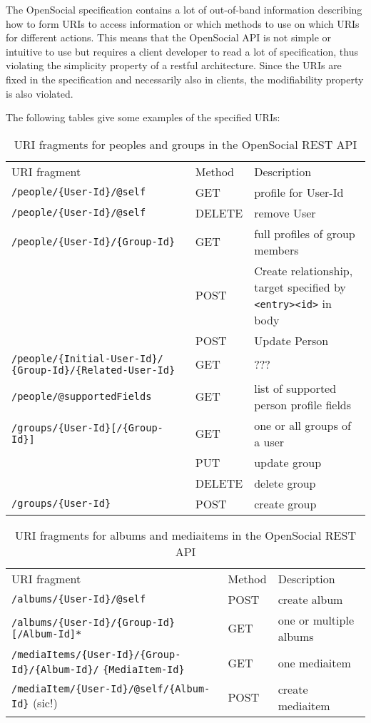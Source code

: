 \documentclass[12pt,a4paper]{scrartcl}		%
\begin{document}
The OpenSocial specification contains a lot of out-of-band information
describing how to form URIs to access information or which methods to use on
which URIs for different actions. This means that the OpenSocial API is not
simple or intuitive to use but requires a client developer to read a lot of
specification, thus violating the simplicity property of a restful
architecture. Since the URIs are fixed in the specification and necessarily also
in clients, the modifiability property is also violated.\cite[sec
2.3]{Fielding2000}

The following tables give some examples of the specified URIs:

\begin{table}[h]
\begin{tabular}{p{6.5cm} l p{10cm}}
  URI fragment & Method & Description \\
  \verb:/people/{User-Id}/@self: & GET & profile for User-Id \\
  \verb:/people/{User-Id}/@self: & DELETE & remove User \\
  \verb:/people/{User-Id}/{Group-Id}: & GET & full profiles of group members \\
  \verb:: & POST & Create relationship, target specified \newline by \verb:<entry><id>: in body \\
   & POST & Update Person \\
  \verb:/people/{Initial-User-Id}/: \newline \verb:{Group-Id}/{Related-User-Id}: & GET & ??? \\
  \verb:/people/@supportedFields: & GET & list of supported person profile fields \\
  \verb:/groups/{User-Id}[/{Group-Id}]: & GET & one or all groups of a user \\
   & PUT & update group \\
   & DELETE & delete group \\
  \verb:/groups/{User-Id}: & POST & create group \\
\end{tabular}
  \caption{URI fragments for peoples and groups in the OpenSocial REST API}
\end{table}

\begin{table}[h]
\begin{tabular}{p{9.5cm} l p{8cm}}
  URI fragment & Method & Description \\
  \verb:/albums/{User-Id}/@self: & POST & create album \\
  \verb:/albums/{User-Id}/{Group-Id}[/Album-Id]*: & GET & one or multiple albums \\
  \verb:/mediaItems/{User-Id}/{Group-Id}/{Album-Id}/: \newline \verb:{MediaItem-Id}: & GET & one mediaitem \\
  \verb:/mediaItem/{User-Id}/@self/{Album-Id}: (sic!) & POST & create mediaitem \\
\end{tabular}
  \caption{URI fragments for albums and mediaitems in the OpenSocial REST API}
  \label{tab:OSURIAlbums}
\end{table}
\end{document}
